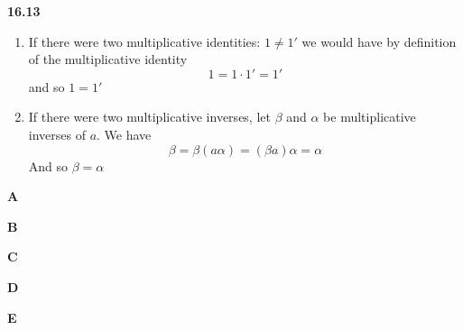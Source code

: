 \documentclass[12pt]{article}
\newenvironment{ques}{\vspace{2 ex}}{\vspace{2 ex}}
\theoremstyle{definition}
\begin{document}
\begin{ques}
	\textbf{16.13}
		\begin{enumerate}
			\item
				If there were two multiplicative identities: $1
				\neq 1'$ we would have by definition of the
				multiplicative identity
				$$1 = 1\cdot1' = 1'$$
				and so $1 = 1'$
			\item
				If there were two multiplicative inverses, let
				$\beta$ and $\alpha$ be multiplicative
				inverses of $a$. We have
				$$\beta = \beta(a \alpha) = (\beta a)\alpha =
				\alpha$$
				And so $\beta = \alpha$
		\end{enumerate}
\end{ques}

\begin{ques}
	\textbf{A}
		
\end{ques}

\begin{ques}
	\textbf{B}
		
\end{ques}

\begin{ques}
	\textbf{C}
		
\end{ques}

\begin{ques}
	\textbf{D}
\end{ques}

\begin{ques}
	\textbf{E}
\end{ques}
\end{document}
